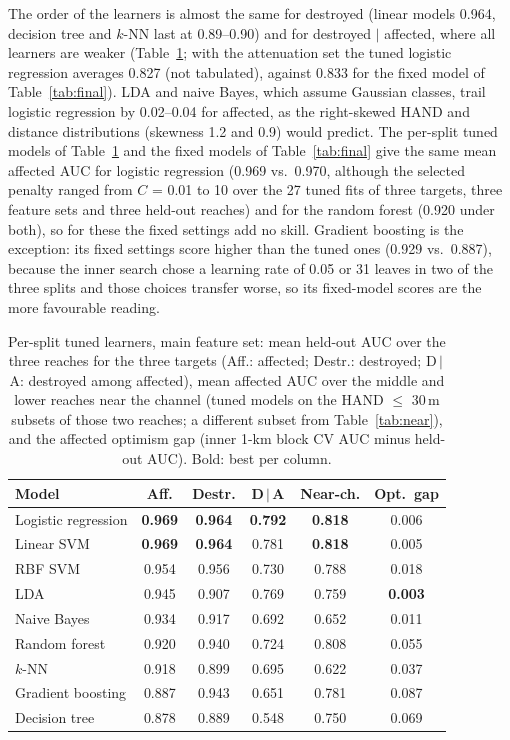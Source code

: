 \documentclass[journal,a4paper]{IEEEtran}
\begin{document}
The order of the learners is almost the same for destroyed (linear models 0.964, decision tree and $k$-NN last at 0.89--0.90) and for destroyed $\mid$ affected, where all learners are weaker (Table~\ref{tab:models}; with the attenuation set the tuned logistic regression averages 0.827 (not tabulated), against 0.833 for the fixed model of Table~\ref{tab:final}). LDA and naive Bayes, which assume Gaussian classes, trail logistic regression by 0.02--0.04 for affected, as the right-skewed HAND and distance distributions (skewness 1.2 and 0.9) would predict. The per-split tuned models of Table~\ref{tab:models} and the fixed models of Table~\ref{tab:final} give the same mean affected AUC for logistic regression (0.969 vs.\ 0.970, although the selected penalty ranged from $C$ = 0.01 to 10 over the 27 tuned fits of three targets, three feature sets and three held-out reaches) and for the random forest (0.920 under both), so for these the fixed settings add no skill. Gradient boosting is the exception: its fixed settings score higher than the tuned ones (0.929 vs.\ 0.887), because the inner search chose a learning rate of 0.05 or 31 leaves in two of the three splits and those choices transfer worse, so its fixed-model scores are the more favourable reading.

\begin{table}[t]
\centering\footnotesize
\setlength{\tabcolsep}{3pt}
\caption{Per-split tuned learners, main feature set: mean held-out AUC over the three reaches for the three targets (Aff.: affected; Destr.: destroyed; D\,$\mid$\,A: destroyed among affected), mean affected AUC over the middle and lower reaches near the channel (tuned models on the HAND $\leq$ 30\,m subsets of those two reaches; a different subset from Table~\ref{tab:near}), and the affected optimism gap (inner 1-km block CV AUC minus held-out AUC). Bold: best per column.}\label{tab:models}
\setlength{\tabcolsep}{2.5pt}
\begin{tabular}{@{}lccccc@{}}
\toprule
\textbf{Model} & \textbf{Aff.} & \textbf{Destr.} & \textbf{D\,$\mid$\,A} & \textbf{Near-ch.} & \textbf{Opt.\ gap}\\
\midrule
Logistic regression & \textbf{0.969} & \textbf{0.964} & \textbf{0.792} & \textbf{0.818} & 0.006\\
Linear SVM & \textbf{0.969} & \textbf{0.964} & 0.781 & \textbf{0.818} & 0.005\\
RBF SVM & 0.954 & 0.956 & 0.730 & 0.788 & 0.018\\
LDA & 0.945 & 0.907 & 0.769 & 0.759 & \textbf{0.003}\\
Naive Bayes & 0.934 & 0.917 & 0.692 & 0.652 & 0.011\\
Random forest & 0.920 & 0.940 & 0.724 & 0.808 & 0.055\\
$k$-NN & 0.918 & 0.899 & 0.695 & 0.622 & 0.037\\
Gradient boosting & 0.887 & 0.943 & 0.651 & 0.781 & 0.087\\
Decision tree & 0.878 & 0.889 & 0.548 & 0.750 & 0.069\\
\bottomrule
\end{tabular}
\end{table}
\end{document}
